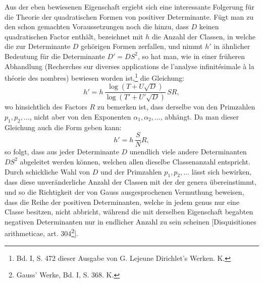 \documentclass[11pt]{article}
\begin{document}
Aus der eben bewiesenen Eigenschaft ergiebt sich eine interessante Folgerung für die Theorie der quadratischen Formen von positiver Determinante. Fügt man zu den schon gemachten Voraussetzungen noch die hinzu, dass \(D\) keinen quadratischen Factor enthält, bezeichnet mit \(h\) die Anzahl der Classen, in welche die zur Determinante \(D\) gehörigen Formen zerfallen, und nimmt \(h'\) in ähnlicher Bedeutung für die Determinante \(D'=DS^2\), so hat man, wie in einer früheren Abhandlung (Recherches sur diverses applications de l'analyse infinitésimale à la théorie des nombres) bewiesen worden ist,\footnote{Bd. I, S. 472 dieser Ausgabe von G. Lejeune Dirichlet's Werken. K.} die Gleichung:
\[
h'=h\,\frac{\log(T+U\sqrt D)}{\log(T'+U'\sqrt D)}\,SR,
\]
wo hinsichtlich des Factors \(R\) zu bemerken ist, dass derselbe von den Primzahlen \(p_1,p_2,\ldots\), nicht aber von den Exponenten \(\alpha_1,\alpha_2,\ldots\), abhängt. Da man dieser Gleichung auch die Form geben kann:
\[
h'=h\,\frac{S}{N}R,
\]
so folgt, dass aus jeder Determinante \(D\) unendlich viele andere Determinanten \(DS^2\) abgeleitet werden können, welchen allen dieselbe Classenanzahl entspricht. Durch schickliche Wahl von \(D\) und der Primzahlen \(p_1,p_2,\ldots\) lässt sich bewirken, dass diese unveränderliche Anzahl der Classen mit der der genera übereinstimmt, und so die Richtigkeit der von Gauss ausgesprochenen Vermuthung beweisen, dass die Reihe der positiven Determinanten, welche in jedem genus nur eine Classe besitzen, nicht abbricht, während die mit derselben Eigenschaft begabten negativen Determinanten nur in endlicher Anzahl zu sein scheinen [Disquisitiones arithmeticae, art. 304\footnote{Gauss' Werke, Bd. I, S. 368. K.}].
\end{document}
